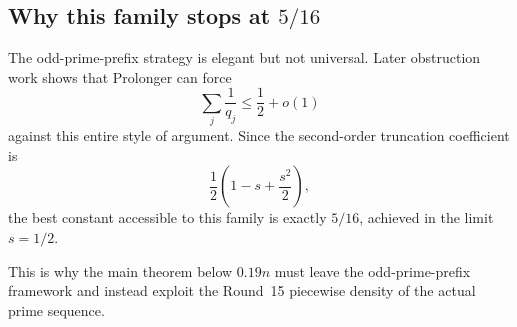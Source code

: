 \subsection{Why this family stops at \texorpdfstring{$5/16$}{5/16}}

The odd-prime-prefix strategy is elegant but not universal.  Later obstruction
work shows that Prolonger can force
\[
  \sum_{j} \frac1{q_j} \le \frac12 + o(1)
\]
against this entire style of argument.  Since the second-order truncation
coefficient is
\[
  \frac12\left(1-s+\frac{s^2}{2}\right),
\]
the best constant accessible to this family is exactly $5/16$, achieved in the
limit $s=1/2$.

This is why the main theorem below $0.19n$ must leave the odd-prime-prefix
framework and instead exploit the Round~15 piecewise density of the actual prime
sequence.
